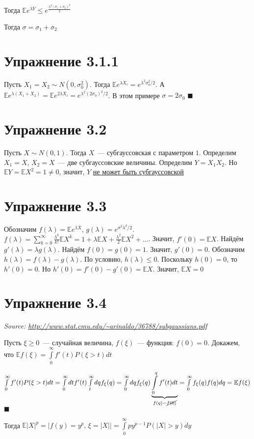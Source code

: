 \documentclass[a4paper]{article}
\begin{document}
Тогда $\mathbb{E}e^{\lambda Y}\leqslant e^{\frac{\lambda^2(\sigma_1+\sigma_2)^2}{2}}$

Тогда $\boxed{\sigma=\sigma_1+\sigma_2}$
\section*{Упражнение 3.1.1}
Пусть $X_1=X_2\sim N(0,\sigma_0^2)$. Тогда $\mathbb{E}e^{\lambda X_i}=e^{\lambda^2\sigma_0^2/2}$. А $\mathbb{E}e^{\lambda (X_1+X_2)}=\mathbb{E}e^{2\lambda X_i}=e^{\lambda^2(2\sigma_0)^2/2}$. В этом примере $\sigma=2\sigma_0$ $\blacksquare$
\section*{Упражнение 3.2}
Пусть $X\sim N(0,1)$. Тогда $X$~--- субгауссовская с параметром $1$. Определим $X_1=X$, $X_2=X$~--- две субгауссовские величины. Определим $Y=X_1X_2$. Но $\mathbb{E}Y=\mathbb{E}X^2=1\neq 0$, значит, $Y$ \underline{не может быть субгауссовской}
\section*{Упражнение 3.3}
Обозначим $f(\lambda)=\mathbb{E}e^{\lambda X}$, $g(\lambda)=e^{\sigma^2\lambda^2/2}$. $f(\lambda)=\sum\limits_{k=0}^\infty \frac{\lambda^k}{k!}\mathbb{E}X^k=1+\lambda \mathbb{E}X+\frac{\lambda^2}{2}\mathbb{E}X^2+...$. Значит, $f'(0)=\mathbb{E}X$. Найдём $g'(\lambda)=\lambda g(\lambda)$. Найдём $f(0)=g(0)=1$. Значит, $g'(0)=0$. Обозначим $h(\lambda)=f(\lambda)-g(\lambda)$. По условию, $h(\lambda)\leqslant 0$. Поскольку $h(0)=0$, то $h'(0)=0$. Но $h'(0)=f'(0)-g'(0)=\mathbb{E}X$. Значит, $\boxed{\mathbb{E}X=0}$
\section*{Упражнение 3.4}
{\em Source: \url{http://www.stat.cmu.edu/~arinaldo/36788/subgaussians.pdf}}

Пусть $\xi\geqslant 0$~--- случайная величина, $f(\xi)$~--- функция: $f(0)=0$. Докажем, что $\mathbb{E}f(\xi)=\int\limits_0^\infty f'(t)P(\xi>t)dt$

$\int\limits_0^\infty f'(t)P(\xi>t)dt=\int\limits_0^\infty dtf'(t)\int\limits_t^\infty dq f_\xi(q)=\int\limits_0^\infty dq f_\xi(q)\underbrace{\int\limits_0^qf'(t)dt}_{f(q)-\cancel{f(0)}}=\int\limits_0^\infty f_{\xi}(q)f(q)dq=\mathbb{E}f(\xi)$ $\blacksquare$

Тогда $\mathbb{E}|X|^p=\big|f(y)=y^p,\,\xi=|X|\big|=\int\limits_0^\infty py^{p-1}P(|X|>y)dy$
\end{document}
